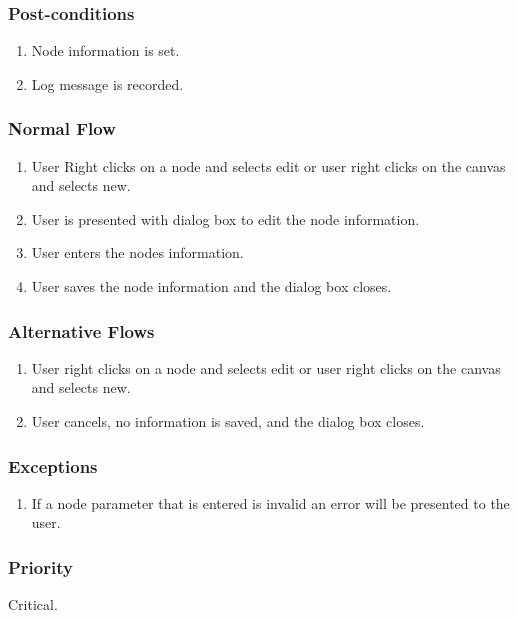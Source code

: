 \documentclass[a4paper,11pt,titlepage]{article}
\begin{document}
\subsubsection{Post-conditions}

\begin{enumerate}
  \item Node information is set.
  \item Log message is recorded.
\end{enumerate}

\subsubsection{Normal Flow}
\begin{enumerate}
  \item User Right clicks on a node and selects edit or user right clicks on the canvas and selects new.
  \item User is presented with dialog box to edit the node information.
  \item User enters the nodes information.
  \item User saves the node information and the dialog box closes.
\end{enumerate}

\subsubsection{Alternative Flows}

\begin{enumerate}
  \item User right clicks on a node and selects edit or user right clicks on the canvas and selects new.
  \item User cancels, no information is saved, and the dialog box closes.
\end{enumerate}

\subsubsection{Exceptions}

\begin{enumerate}
  \item  If a node parameter that is entered is invalid an error will be presented to the user.
\end{enumerate}

\subsubsection{Priority}
Critical.
\end{document}
